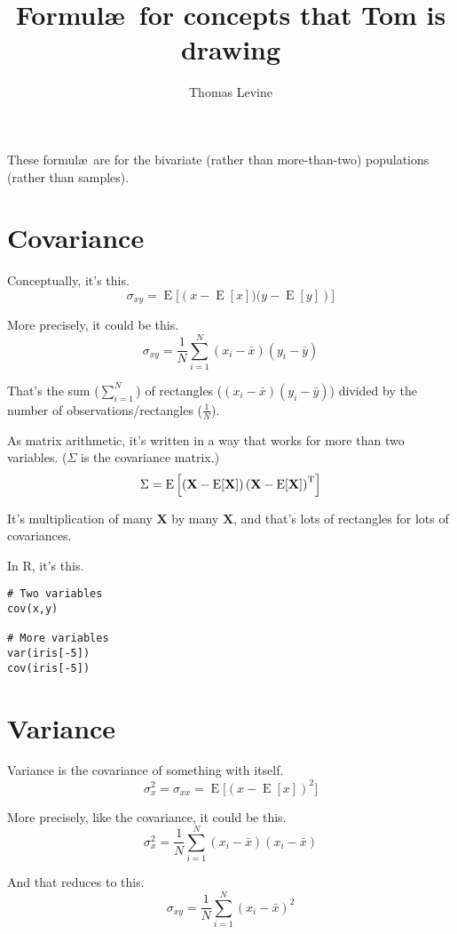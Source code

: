 \documentclass{article}
\title{Formul\ae\ for concepts that Tom is drawing}
\author{Thomas Levine}
\begin{document}
\maketitle

These formul\ae\ are for the bivariate (rather than more-than-two) populations (rather than samples).

\section{Covariance}
Conceptually, it's this.
$$ \sigma_{xy} = \operatorname{E}{\big[\left(x - \operatorname{E}[x])(y - \operatorname{E}[y]\right)\big]} $$

More precisely, it could be this.
$$ \sigma_{xy} = \frac{1}{N}\sum_{i=1}^{N}\left( x_{i}-\bar{x} \right) \left( y_{i}-\bar{y} \right) $$

That's the sum ($\sum_{i=1}^{N}$) of rectangles
($\left( x_{i}-\bar{x} \right) \left( y_{i}-\bar{y} \right)$)
divided by the number of observations/rectangles ($\frac{1}{N}$).

As matrix arithmetic, it's written in a way that works for more than two variables.
($\Sigma$ is the covariance matrix.)
$$ \Sigma=\mathrm{E}
\left[
 \left(
  \textbf{X} - \mathrm{E}[\textbf{X}]
   \right)
  \left(
   \textbf{X} - \mathrm{E}[\textbf{X}]
    \right)^{\rm T}
    \right]
$$

It's multiplication of many $\textbf{X}$ by many $\textbf{X}$, and that's lots of
rectangles for lots of covariances.

In R, it's this.

\begin{verbatim}
# Two variables
cov(x,y)

# More variables
var(iris[-5])
cov(iris[-5])
\end{verbatim}

\section{Variance}
Variance is the covariance of something with itself.
$$ \sigma_{x}^2 = \sigma_{xx} = \operatorname{E}{\big[\left(x - \operatorname{E}[x]\right)^2\big]} $$

More precisely, like the covariance, it could be this.
$$ \sigma_{x}^2 = \frac{1}{N}\sum_{i=1}^{N}\left( x_{i}-\bar{x} \right) \left( x_{i}-\bar{x} \right) $$

And that reduces to this.
$$ \sigma_{xy} = \frac{1}{N}\sum_{i=1}^{N}\left( x_{i}-\bar{x} \right)^2 $$
\end{document}
